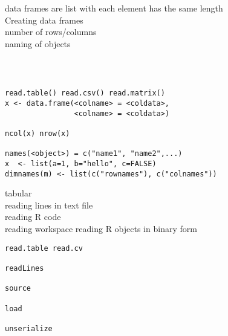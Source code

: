 \documentclass[12pt,a4paper]{report}
\begin{document}
\begin{tcolorbox}[colback=pageyl,colframe=pagebl,title= R  \hfill Data Frames,coltitle=Magenta,fonttitle=\bfseries,coltext=Black,width=0.9\paperwidth,boxrule=2mm]\colorbox{pageyl}{\noindent\begin{minipage}[t]{0.3\textwidth}\sffamily \color{ctnb}\vspace{\baselineskip}
data frames are list with each element has the same length\\[\baselineskip]
Creating data frames\\[2\baselineskip]
number of rows/columns\\[\baselineskip]
naming of objects\\[\baselineskip]

\end{minipage}}\qquad\begin{minipage}[t]{0.672\textwidth}
{\begin{lstlisting}[frame=single,framerule=0pt, numbers=none, numbersep=10pt, aboveskip=20pt,belowskip=20pt]



read.table() read.csv() read.matrix()
x <- data.frame(<colname> = <coldata>, 
				<colname> = <coldata>)

ncol(x) nrow(x)

names(<object>) = c("name1", "name2",...)
x  <- list(a=1, b="hello", c=FALSE)
dimnames(m) <- list(c("rownames"), c("colnames"))
\end{lstlisting}}\end{minipage}\end{tcolorbox}

\begin{tcolorbox}[colback=pageyl,colframe=pagebl,title= R \hfill Reading Data,coltitle=Magenta,fonttitle=\bfseries,coltext=Black,width=0.9\paperwidth,boxrule=2mm]\colorbox{pageyl}{\noindent\begin{minipage}[t]{0.3\textwidth}\sffamily \color{ctnb}\vspace{\baselineskip}
tabular\\[\baselineskip]
reading lines in text file\\[\baselineskip]
reading R code\\[\baselineskip]
reading workspace
reading R objects in binary form
\end{minipage}}\qquad\begin{minipage}[t]{0.672\textwidth}
{\begin{lstlisting}[frame=single,framerule=0pt, numbers=none, numbersep=10pt, aboveskip=20pt,belowskip=20pt]
read.table read.cv

readLines

source

load

unserialize
\end{lstlisting}}\end{minipage}\end{tcolorbox}
\end{document}
